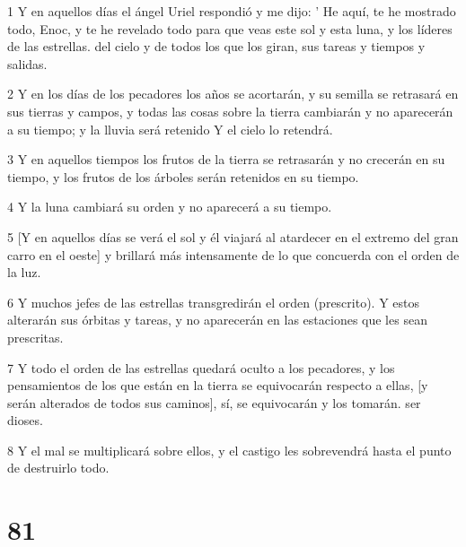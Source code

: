 \par 1 Y en aquellos días el ángel Uriel respondió y me dijo: ' He aquí, te he mostrado todo, Enoc, y te he revelado todo para que veas este sol y esta luna, y los líderes de las estrellas. del cielo y de todos los que los giran, sus tareas y tiempos y salidas.
\par 2 Y en los días de los pecadores los años se acortarán, y su semilla se retrasará en sus tierras y campos, y todas las cosas sobre la tierra cambiarán y no aparecerán a su tiempo; y la lluvia será retenido Y el cielo lo retendrá.
\par 3 Y en aquellos tiempos los frutos de la tierra se retrasarán y no crecerán en su tiempo, y los frutos de los árboles serán retenidos en su tiempo.
\par 4 Y la luna cambiará su orden y no aparecerá a su tiempo.
\par 5 [Y en aquellos días se verá el sol y él viajará al atardecer en el extremo del gran carro en el oeste] y brillará más intensamente de lo que concuerda con el orden de la luz.
\par 6 Y muchos jefes de las estrellas transgredirán el orden (prescrito). Y estos alterarán sus órbitas y tareas, y no aparecerán en las estaciones que les sean prescritas.
\par 7 Y todo el orden de las estrellas quedará oculto a los pecadores, y los pensamientos de los que están en la tierra se equivocarán respecto a ellas, [y serán alterados de todos sus caminos], sí, se equivocarán y los tomarán. ser dioses.
\par 8 Y el mal se multiplicará sobre ellos, y el castigo les sobrevendrá hasta el punto de destruirlo todo.

\chapter{81}

